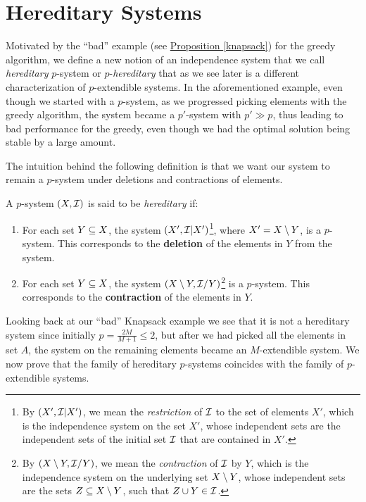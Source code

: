 \section{Hereditary Systems}\label{sec:hereditary}

Motivated by the ``bad'' example (see \hyperref[knapsack]{Proposition \ref{knapsack}}) for the greedy algorithm, we define a new notion of an independence system that we call \textit{hereditary} $p$-system or $p$-\textit{hereditary} that as we see later is a different characterization of $p$-extendible systems. In the aforementioned example, even though we started with a $p$-system, as we progressed picking elements with the greedy algorithm, the system became a $p'$-system with $p' \gg p$, thus leading to bad performance for the greedy, even though we had the optimal solution being stable by a large amount.

The intuition behind the following definition is that we want our system to remain a $p$-system under deletions and contractions of elements.

\begin{definition}
A $p$-system $(X,\mathcal{I})$ is said to be \textit{hereditary} if:
\begin{enumerate}
\item For each set $Y\subseteq X$, the system $(X', \mathcal{I} | X')$\footnote{By $(X',\mathcal{I} | X')$, we mean the \textit{restriction} of $\mathcal{I}$ to the set of elements $X'$, which is the independence system on the set $X'$, whose independent sets are the independent sets of the initial set $\mathcal{I}$ that are contained in $X'$.}, where $X'=X \setminus Y$, is a $p$-system. This corresponds to the {\bf deletion} of the elements in $Y$ from the system.
\item For each set $Y\subseteq X$,  the system $(X\setminus Y, \mathcal{I} / Y)$\footnote{By $(X\setminus Y,\mathcal{I} / Y)$, we mean the \textit{contraction} of $\mathcal{I}$ by $Y$, which is the independence system on the underlying set $X\setminus Y$, whose independent sets are the sets $Z \subseteq X\setminus Y$, such that $Z\cup Y \in \mathcal{I}$.} is a $p$-system. This corresponds to the {\bf contraction} of the elements in $Y$.
\end{enumerate}
\end{definition}

\noindent Looking back at our ``bad'' Knapsack example we see that it is not a hereditary system since initially $p=\tfrac{2M}{M+1}\le 2$, but after we had picked all the elements in set $A$, the system on the remaining elements became an $M$-extendible system. We now prove that the family of hereditary $p$-systems coincides with the family of $p$-extendible systems.  

